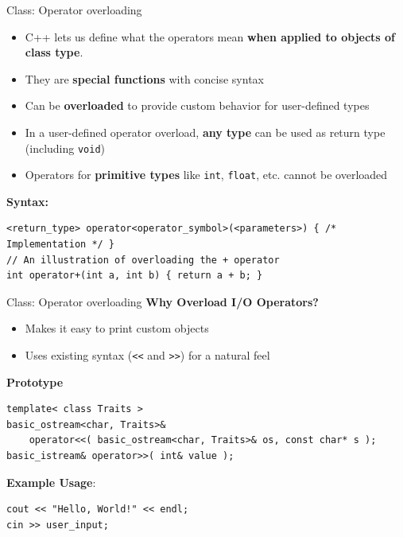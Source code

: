 \begin{frame}[fragile]{Class: Operator overloading}
	\begin{itemize}
        \item C++ lets us define what the operators mean \textbf{when applied to objects of class type}.
		\item They are \textbf{special functions} with concise syntax
		\item Can be \textbf{overloaded} to provide custom behavior for user-defined types
        \item In a user-defined operator overload, \textbf{any type} can be used as return type (including \texttt{void})
		\item Operators for \textbf{primitive types} like \texttt{int}, \texttt{float}, etc. cannot be overloaded
	\end{itemize}

	\textbf{Syntax:}
	\begin{verbatim}
<return_type> operator<operator_symbol>(<parameters>) { /* Implementation */ }
// An illustration of overloading the + operator
int operator+(int a, int b) { return a + b; }
    \end{verbatim}
\end{frame}

\begin{frame}[fragile]{Class: Operator overloading}
    \textbf{Why Overload I/O Operators?}
    \begin{itemize}
        \item Makes it easy to print custom objects
        \item Uses existing syntax (\texttt{<<} and \texttt{>>}) for a natural feel
    \end{itemize}

    \textbf{Prototype}
    \begin{verbatim}
template< class Traits >
basic_ostream<char, Traits>&
    operator<<( basic_ostream<char, Traits>& os, const char* s );
basic_istream& operator>>( int& value );
    \end{verbatim}
    \textbf{Example Usage}:
	\begin{verbatim}
cout << "Hello, World!" << endl;
cin >> user_input;
    \end{verbatim}
\end{frame}

